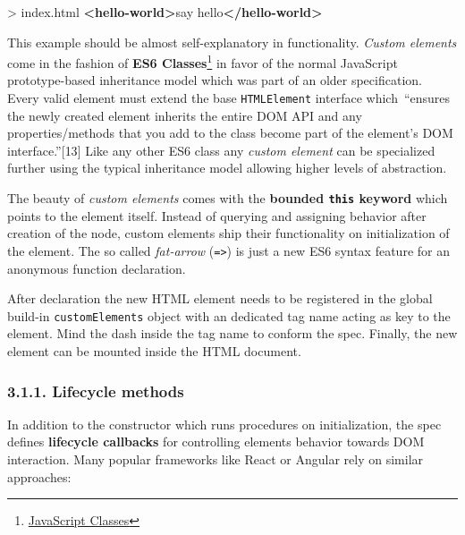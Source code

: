 \documentclass[]{article}
\newenvironment{Shaded}{}{}
\newcommand{\KeywordTok}[1]{\textcolor[rgb]{0.00,0.44,0.13}{\textbf{{#1}}}}
\newcommand{\NormalTok}[1]{{#1}}
\begin{document}
\begin{Shaded}
\begin{Highlighting}[]
\NormalTok{> index.html}
\KeywordTok{<hello-world>}\NormalTok{say hello}\KeywordTok{</hello-world>}
\end{Highlighting}
\end{Shaded}

This example should be almost self-explanatory in functionality.
\emph{Custom elements} come in the fashion of \textbf{ES6
Classes}\footnote{\href{https://developer.mozilla.org/en/docs/Web/JavaScript/Reference/Classes}{JavaScript
  Classes}} in favor of the normal JavaScript prototype-based
inheritance model which was part of an older specification. Every valid
element must extend the base \texttt{HTMLElement} interface
which~``ensures the newly created element inherits the entire DOM API
and any properties/methods that you add to the class become part of the
element's DOM interface.''{[}13{]} Like any other ES6 class any
\emph{custom element} can be specialized further using the typical
inheritance model allowing higher levels of abstraction.

The beauty of \emph{custom elements} comes with the \textbf{bounded
\texttt{this} keyword} which points to the element itself. Instead of
querying and assigning behavior after creation of the node, custom
elements ship their functionality on initialization of the element. The
so called \emph{fat-arrow} (\texttt{=\textgreater{}}) is just a new ES6
syntax feature for an anonymous function declaration.

After declaration the new HTML element needs to be registered in the
global build-in \texttt{customElements} object with an dedicated tag
name acting as key to the element. Mind the dash inside the tag name to
conform the spec. Finally, the new element can be mounted inside the
HTML document.

\subsubsection{3.1.1. Lifecycle methods}\label{lifecycle-methods}

In addition to the constructor which runs procedures on initialization,
the spec defines \textbf{lifecycle callbacks} for controlling elements
behavior towards DOM interaction. Many popular frameworks like React or
Angular rely on similar approaches:
\end{document}

